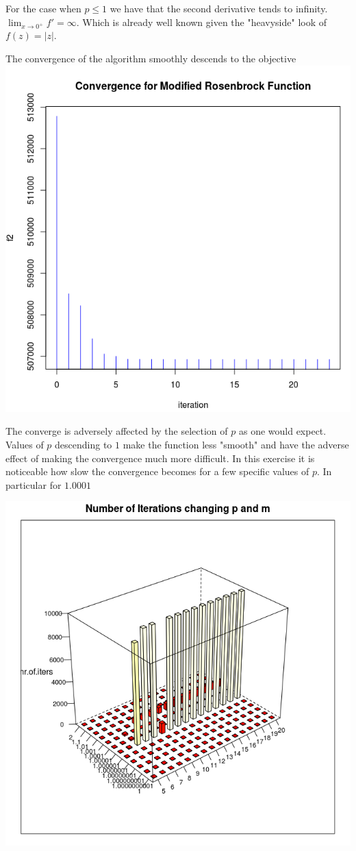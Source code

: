 For the case when $p \leq 1$ we have that the second derivative tends to infinity. $\displaystyle \lim_{x \to 0^+} {f' = \infty}$. Which is already well known given the "heavyside" look of $f(z) = |z|$.

The convergence of the algorithm smoothly descends to the objective 
\centering
\includegraphics[scale=0.3]{Figures/convergence.png}

The converge is adversely affected by the selection of $p$ as one would expect. Values of $p$ descending to $1$ make the function less "smooth" and have the adverse effect of making the convergence much more difficult. In this exercise it is noticeable how slow the convergence becomes for a few specific values of $p$. In particular for $1.0001$

\centering
\includegraphics[scale=0.3]{Figures/hist3dmpniter.png}


